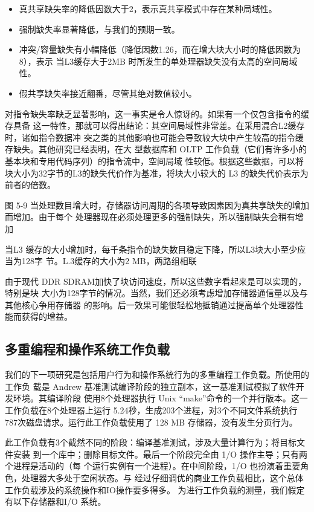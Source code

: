 \begin{itemize}
    \item 真共享缺失率的降低因数大于2，表示真共享模式中存在某种局域性。
    \item 强制缺失率显著降低，与我们的预期一致。
    \item 冲突/容量缺失有小幅降低（降低因数1.26，而在增大块大小时的降低因数为8），表示
    当L3缓存大于2MB 时所发生的单处理器缺失没有太高的空间局域性。
    \item 假共享缺失率接近翻番，尽管其绝对数值较小。
\end{itemize}

对指令缺失率缺乏显著影响，这一事实是令人惊讶的。如果有一个仅包含指令的缓存具备
这一特性，那就可以得出结论：其空间局域性非常差。在采用混合L2缓存时，诸如指令数据冲
突之类的其他影响也可能会导致较大块中产生较高的指令缓存缺失。其他研究已经表明，在大
型数据库和 OLTP 工作负载（它们有许多小的基本块和专用代码序列）的指令流中，空间局域
性较低。根据这些数据，可以将块大小为32字节的L3的缺失代价作为基准，将块大小较大的
L3 的缺失代价表示为前者的倍数。

图 5-9 当处理数目增大时，存储器访问周期的各项导致因素因为真共享缺失的增加而增加。由于每个
处理器现在必须处理更多的强制缺失，所以强制缺失会稍有增加

当L3 缓存的大小增加时，每千条指令的缺失数目稳定下降，所以L3块大小至少应当为128字
节。L.3缓存的大小为2 MB，两路组相联

由于现代 DDR SDRAM加快了块访问速度，所以这些数字看起来是可以实现的，特别是块
大小为128字节的情况。当然，我们还必须考虑增加存储器通信量以及与其他核心争用存储器
的影响。后一效果可能很轻松地抵销通过提高单个处理器性能而获得的增益。

\subsection{多重编程和操作系统工作负载}
我们的下一项研究是包括用户行为和操作系统行为的多重编程工作负载。所使用的工作负
载是 Andrew 基准测试编译阶段的独立副本，这一基准测试模拟了软件开发环境。其编译阶段
使用8个处理器执行 Unix “make”命令的一个并行版本。这一工作负载在8个处理器上运行
5.24秒，生成203个进程，对3个不同文件系统执行 787次磁盘请求。运行此工作负载使用了
128 MB 存储器，没有发生分页行为。

此工作负载有3个截然不同的阶段：编译基准测试，涉及大量计算行为；将目标文件安装
到一个库中；删除目标文件。最后一个阶段完全由 1/O 操作主导；只有两个进程是活动的（每
个运行实例有一个进程）。在中间阶段，1/O 也扮演着重要角色，处理器大多处于空闲状态。与
经过仔细调优的商业工作负载相比，这个总体工作负载涉及的系统操作和IO操作要多得多。
为进行工作负载的测量，我们假定有以下存储器和I/O 系统。

